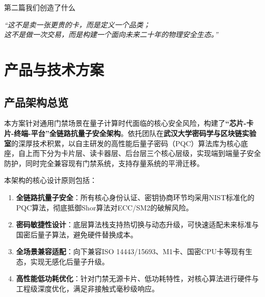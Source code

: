 \cleardoublepage
\thispagestyle{empty} %

\vspace*{6cm} %

\begin{center}
	{\heiti\erhao 第二篇\quad 我们创造了什么} 
	
	\vspace{2cm} %
	
	{\songti\xiaosi \textit{“这不是卖一张更贵的卡，而是定义一个品类；\\ [0.5em] 这不是做一次交易，而是构建一个面向未来二十年的物理安全生态。”}}
\end{center}

\vfill
\cleardoublepage %


\chapter{产品与技术方案}

\section{产品架构总览}

本方案针对通用门禁场景在量子计算时代面临的核心安全风险，构建了\textbf{“芯片-卡片-终端-平台”全链路抗量子安全架构}。依托团队在\textbf{武汉大学密码学与区块链实验室}的深厚技术积累，以自主研发的高性能后量子密码（PQC）算法库为核心底座，自上而下分为卡片层、读卡器层、后台层三个核心层级，实现端到端量子安全防护，同时完全兼容现有门禁系统，支持存量系统的平滑迁移。

本架构的核心设计原则包括：
\begin{enumerate}
	\item \textbf{全链路抗量子安全}：所有核心身份认证、密钥协商环节均采用NIST标准化的PQC算法，彻底抵御Shor算法对ECC/SM2的破解风险。
	\item \textbf{密码敏捷性设计}：底层算法栈支持热切换与动态升级，可快速适配未来标准与国密后量子算法，避免硬件替换成本。
	\item \textbf{全场景兼容适配}：向下兼容ISO 14443/15693、M1卡、国密CPU卡等现有生态，实现无感化后量子升级。
	\item \textbf{高性能低功耗优化}：针对门禁无源卡片、低功耗特性，对核心算法进行硬件与工程级深度优化，满足非接触式毫秒级响应。
\end{enumerate}

